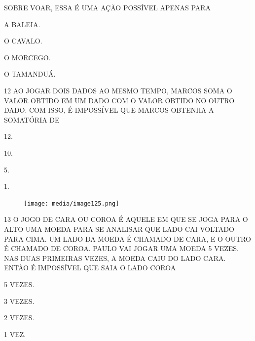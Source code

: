 SOBRE VOAR, ESSA É UMA AÇÃO POSSÍVEL APENAS PARA

\begin{escolha}%
\item A BALEIA.

\item O CAVALO.

\item O MORCEGO.

\item O TAMANDUÁ.
\end{escolha}

\num{12} AO JOGAR DOIS DADOS AO MESMO TEMPO, MARCOS SOMA O VALOR OBTIDO EM UM DADO COM O VALOR OBTIDO NO OUTRO DADO.
COM ISSO, É IMPOSSÍVEL QUE MARCOS OBTENHA A SOMATÓRIA DE

\begin{multicols}{2}
\begin{escolha}[itemsep=0pt]
\item 12.

\item 10.

\item 5.

\item 1.
\end{escolha}
\end{multicols}

\begin{figure}[H]
\centering
\texttt{[image: media/image125.png]}
\end{figure}

\num{13} O JOGO DE CARA OU COROA É AQUELE EM QUE SE JOGA PARA O ALTO UMA MOEDA
PARA SE ANALISAR QUE LADO CAI VOLTADO PARA CIMA. UM LADO DA MOEDA É CHAMADO DE
CARA, E O OUTRO É CHAMADO DE COROA. PAULO VAI JOGAR UMA MOEDA 5 VEZES. NAS DUAS
PRIMEIRAS VEZES, A MOEDA CAIU DO LADO CARA. ENTÃO É IMPOSSÍVEL QUE SAIA O LADO
COROA

\begin{multicols}{2}
\begin{escolha}[itemsep=0pt]
\item 5 VEZES.

\item 3 VEZES.

\item 2 VEZES.

\item 1 VEZ.
\end{escolha}
\end{multicols}

